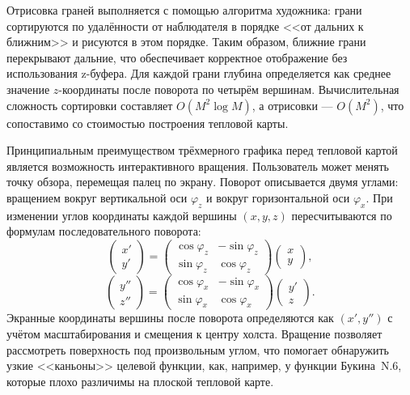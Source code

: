 \documentclass[14pt, russian]{scrartcl}
\begin{document}
Отрисовка граней выполняется с помощью алгоритма художника: 
грани сортируются по удалённости от наблюдателя в порядке
<<от дальних к ближним>> и рисуются в этом порядке. Таким образом,
ближние грани перекрывают дальние, что обеспечивает корректное
отображение без использования z-буфера. Для каждой грани глубина
определяется как среднее значение $z$-координаты после поворота по
четырём вершинам. Вычислительная сложность сортировки составляет
$O(M^2 \log M)$, а отрисовки --- $O(M^2)$, что сопоставимо со
стоимостью построения тепловой карты.

Принципиальным преимуществом трёхмерного графика перед тепловой картой
является возможность интерактивного вращения. Пользователь может менять
точку обзора, перемещая палец по экрану. Поворот описывается двумя
углами: вращением вокруг вертикальной оси $\varphi_z$ и
вокруг горизонтальной оси $\varphi_x$. При изменении углов
координаты каждой вершины $(x, y, z)$ пересчитываются по формулам
последовательного поворота:
\begin{equation}
  \begin{pmatrix} x' \\ y' \end{pmatrix} =
  \begin{pmatrix}
    \cos\varphi_z & -\sin\varphi_z \\
    \sin\varphi_z & \cos\varphi_z
  \end{pmatrix}
  \begin{pmatrix} x \\ y \end{pmatrix},
\end{equation}
\begin{equation}
  \begin{pmatrix} y'' \\ z'' \end{pmatrix} =
  \begin{pmatrix}
    \cos\varphi_x & -\sin\varphi_x \\
    \sin\varphi_x & \cos\varphi_x
  \end{pmatrix}
  \begin{pmatrix} y' \\ z \end{pmatrix}.
\end{equation}
Экранные координаты вершины после поворота определяются как $(x', y'')$
с учётом масштабирования и смещения к центру холста. Вращение позволяет
рассмотреть поверхность под произвольным углом, что помогает обнаружить
узкие <<каньоны>> целевой функции, как, например, у функции Букина~N.6,
которые плохо различимы на плоской тепловой карте.
\end{document}
